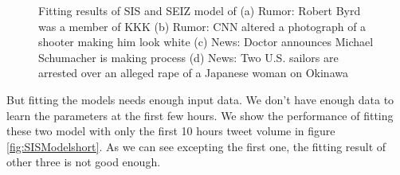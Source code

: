 \begin{figure}[!h]
{}
\caption{Fitting results of SIS and SEIZ model of (a) Rumor: Robert Byrd was a member of KKK (b) Rumor: CNN altered a photograph of a shooter making him look white (c) News: Doctor announces Michael Schumacher is making process (d) News: Two U.S. sailors are arrested over an alleged rape of a Japanese woman on Okinawa}
\label{fig:SISModel}
\end{figure}

 
But fitting the models needs enough input data. We don't have enough data to learn the parameters at the first few hours. We show the performance of fitting these two model with only the first 10 hours tweet volume in figure \ref{fig:SISModelshort}. As we can see excepting the first one, the fitting result of other three is not good enough.

